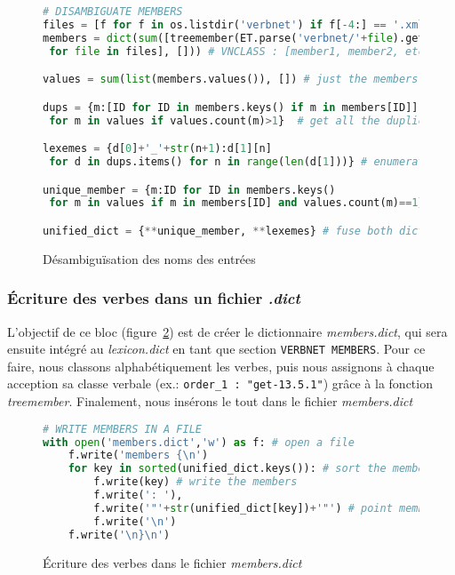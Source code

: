 \begin{figure}[htb]
  \caption{Désambiguïsation des noms des entrées}
	\label{fig:scriptmember-bloc2}
\begin{lstlisting}[language=Python]
# DISAMBIGUATE MEMBERS
files = [f for f in os.listdir('verbnet') if f[-4:] == '.xml']
members = dict(sum([treemember(ET.parse('verbnet/'+file).getroot())
 for file in files], [])) # VNCLASS : [member1, member2, etc. ]

values = sum(list(members.values()), []) # just the members of all classes

dups = {m:[ID for ID in members.keys() if m in members[ID]]
 for m in values if values.count(m)>1}  # get all the duplicates

lexemes = {d[0]+'_'+str(n+1):d[1][n]
 for d in dups.items() for n in range(len(d[1]))} # enumerate all duplicates: eat_1, eat_2

unique_member = {m:ID for ID in members.keys() 
 for m in values if m in members[ID] and values.count(m)==1} #  get all unique lexemes

unified_dict = {**unique_member, **lexemes} # fuse both dict. to get all members disambiguated
\end{lstlisting}
\end{figure}

\subsubsection{Écriture des verbes dans un fichier \emph{.dict}}

L'objectif de ce bloc (figure~\ref{fig:scriptmember-bloc3}) est de créer le dictionnaire \emph{members.dict}, qui sera ensuite intégré au \emph{lexicon.dict} en tant que section \texttt{VERBNET MEMBERS}. Pour ce faire, nous classons alphabétiquement les verbes, puis nous assignons à chaque acception sa classe verbale (ex.: \lstinline|order_1 : "get-13.5.1"|) grâce à la fonction \emph{treemember}. Finalement, nous insérons le tout dans le fichier \emph{members.dict}

\begin{figure}[htb]
  \caption{Écriture des verbes dans le fichier \emph{members.dict}}
	\label{fig:scriptmember-bloc3}
\begin{lstlisting}[language=Python]
# WRITE MEMBERS IN A FILE
with open('members.dict','w') as f: # open a file
    f.write('members {\n')
    for key in sorted(unified_dict.keys()): # sort the members
        f.write(key) # write the members
        f.write(': '),
        f.write('"'+str(unified_dict[key])+'"') # point members towards ID of VNCLASS
        f.write('\n')
    f.write('\n}\n')
\end{lstlisting}
\end{figure}

